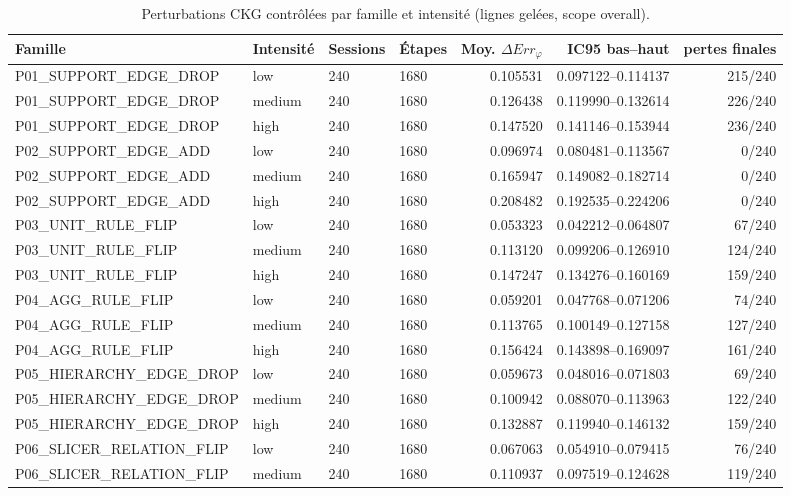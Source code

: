 \begin{table}[t]
\centering
\caption{Perturbations CKG contrôlées par famille et intensité (lignes gelées, scope overall).}
\label{tab:v88-ckg-detail}
\scriptsize
\begin{tabular}{llllrrr}
\hline
Famille & Intensité & Sessions & Étapes & Moy. $\Delta Err_\varphi$ & IC95 bas--haut & pertes finales \\
\hline
P01\_SUPPORT\_EDGE\_DROP & low & 240 & 1680 & 0.105531 & 0.097122--0.114137 & 215/240 \\
P01\_SUPPORT\_EDGE\_DROP & medium & 240 & 1680 & 0.126438 & 0.119990--0.132614 & 226/240 \\
P01\_SUPPORT\_EDGE\_DROP & high & 240 & 1680 & 0.147520 & 0.141146--0.153944 & 236/240 \\
P02\_SUPPORT\_EDGE\_ADD & low & 240 & 1680 & 0.096974 & 0.080481--0.113567 & 0/240 \\
P02\_SUPPORT\_EDGE\_ADD & medium & 240 & 1680 & 0.165947 & 0.149082--0.182714 & 0/240 \\
P02\_SUPPORT\_EDGE\_ADD & high & 240 & 1680 & 0.208482 & 0.192535--0.224206 & 0/240 \\
P03\_UNIT\_RULE\_FLIP & low & 240 & 1680 & 0.053323 & 0.042212--0.064807 & 67/240 \\
P03\_UNIT\_RULE\_FLIP & medium & 240 & 1680 & 0.113120 & 0.099206--0.126910 & 124/240 \\
P03\_UNIT\_RULE\_FLIP & high & 240 & 1680 & 0.147247 & 0.134276--0.160169 & 159/240 \\
P04\_AGG\_RULE\_FLIP & low & 240 & 1680 & 0.059201 & 0.047768--0.071206 & 74/240 \\
P04\_AGG\_RULE\_FLIP & medium & 240 & 1680 & 0.113765 & 0.100149--0.127158 & 127/240 \\
P04\_AGG\_RULE\_FLIP & high & 240 & 1680 & 0.156424 & 0.143898--0.169097 & 161/240 \\
P05\_HIERARCHY\_EDGE\_DROP & low & 240 & 1680 & 0.059673 & 0.048016--0.071803 & 69/240 \\
P05\_HIERARCHY\_EDGE\_DROP & medium & 240 & 1680 & 0.100942 & 0.088070--0.113963 & 122/240 \\
P05\_HIERARCHY\_EDGE\_DROP & high & 240 & 1680 & 0.132887 & 0.119940--0.146132 & 159/240 \\
P06\_SLICER\_RELATION\_FLIP & low & 240 & 1680 & 0.067063 & 0.054910--0.079415 & 76/240 \\
P06\_SLICER\_RELATION\_FLIP & medium & 240 & 1680 & 0.110937 & 0.097519--0.124628 & 119/240 \\

\end{tabular}
\end{table}
